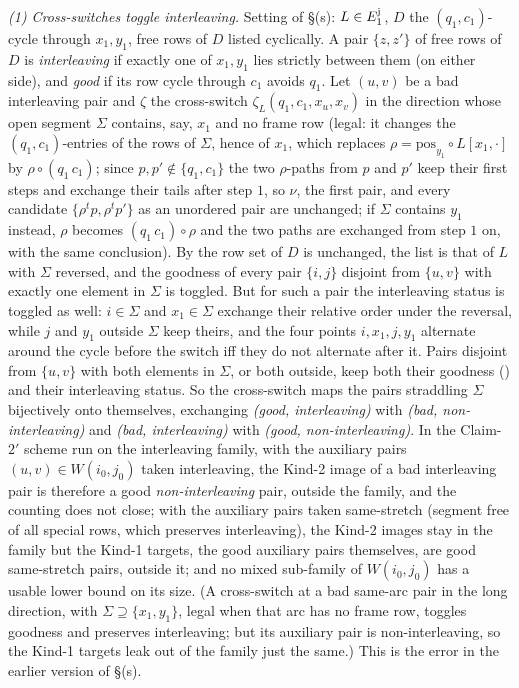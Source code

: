 \emph{(1) Cross-switches toggle interleaving.}  Setting of \S(s):
$L\in E_1^{\rm j}$, $D$ the $(q_1,c_1)$-cycle through $x_1,y_1$, free
rows of $D$ listed cyclically.  A pair $\{z,z'\}$ of free rows of $D$
is \emph{interleaving} if exactly one of $x_1,y_1$ lies strictly
between them (on either side), and \emph{good} if its row cycle through
$c_1$ avoids $q_1$.  Let $(u,v)$ be a bad interleaving pair and $\zeta$
the cross-switch $\zeta_L(q_1,c_1,x_u,x_v)$ in the direction whose open
segment $\Sigma$ contains, say, $x_1$ and no frame row (legal: it
changes the $(q_1,c_1)$-entries of the rows of $\Sigma$, hence of
$x_1$, which replaces $\rho=\mathrm{pos}_{y_1}\circ L[x_1,\cdot]$ by
$\rho\circ(q_1\,c_1)$; since $p,p'\notin\{q_1,c_1\}$ the two
$\rho$-paths from $p$ and $p'$ keep their first steps and exchange
their tails after step $1$, so $\nu$, the first pair, and every
candidate $\{\rho^tp,\rho^tp'\}$ as an unordered pair are unchanged;
if $\Sigma$ contains $y_1$ instead, $\rho$ becomes $(q_1\,c_1)\circ\rho$
and the two paths are exchanged from step $1$ on, with the same
conclusion).  By \cite[Lemma~2.6, Remark~2.7]{AM26} the row set of $D$
is unchanged, the list is that of $L$ with $\Sigma$ reversed, and the
goodness of every pair $\{i,j\}$ disjoint from $\{u,v\}$ with exactly
one element in $\Sigma$ is toggled.  But for such a pair the
interleaving status is toggled as well: $i\in\Sigma$ and $x_1\in\Sigma$
exchange their relative order under the reversal, while $j$ and $y_1$
outside $\Sigma$ keep theirs, and the four points
$i,x_1,j,y_1$ alternate around the cycle before the switch iff they do
not alternate after it.  Pairs disjoint from $\{u,v\}$ with both elements in $\Sigma$, or
both outside, keep both their goodness (\cite[Lemma~2.6(1)]{AM26}) and
their interleaving status.  So the cross-switch maps the pairs
straddling $\Sigma$ bijectively onto themselves, exchanging
\emph{(good, interleaving)} with \emph{(bad, non-interleaving)} and
\emph{(bad, interleaving)} with \emph{(good, non-interleaving)}.  In
the Claim-$2'$ scheme run on the interleaving family, with the
auxiliary pairs $(u,v)\in W(i_0,j_0)$ taken interleaving, the Kind-2
image of a bad interleaving pair is therefore a good
\emph{non-interleaving} pair, outside the family, and the counting
does not close; with the auxiliary pairs taken same-stretch (segment
free of all special rows, which preserves interleaving), the Kind-2
images stay in the family but the Kind-1 targets, the good auxiliary
pairs themselves, are good same-stretch pairs, outside it; and no
mixed sub-family of $W(i_0,j_0)$ has a usable lower bound on its size.
(A cross-switch at a bad same-arc pair in the long direction, with
$\Sigma\supseteq\{x_1,y_1\}$, legal when that arc has no frame row,
toggles goodness and preserves interleaving; but its auxiliary pair is
non-interleaving, so the Kind-1 targets leak out of the family just
the same.)  This is the error in the earlier version of \S(s).

